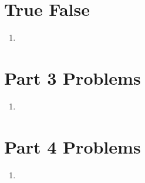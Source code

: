 \documentclass[11pt]{article}
\begin{document}
\section*{True False}
\begin{enumerate}
    \item 
\end{enumerate}
\pagebreak

\section{Part 3 Problems}
\begin{enumerate}
    \item 
\end{enumerate}
\pagebreak

\section{Part 4 Problems}
\begin{enumerate}
    \item 
\end{enumerate}
\pagebreak
\end{document}
